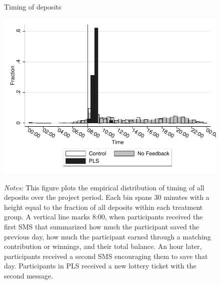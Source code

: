 \documentclass[11pt]{article}
\begin{document}
		\begin{figure}[ht]
		\centering
		\caption{Timing of deposits}
		\includegraphics[width=\textwidth]{../../figures/hist-deposits.pdf}
		\label{fig:hist-deposits}
		\caption*{\footnotesize \emph{Notes:} This figure plots the empirical distribution of timing of all deposits over the project period. Each bin spans 30 minutes with a height equal to the fraction of all deposits within each treatment group. A vertical line marks 8:00, when participants received the first SMS that summarized how much the participant saved the previous day, how much the participant earned through a matching contribution or winnings, and their total balance. An hour later, participants received a second SMS encouraging them to save that day. Participants in PLS received a new lottery ticket with the second message.}
		\end{figure}

		\clearpage

	


\end{document}
